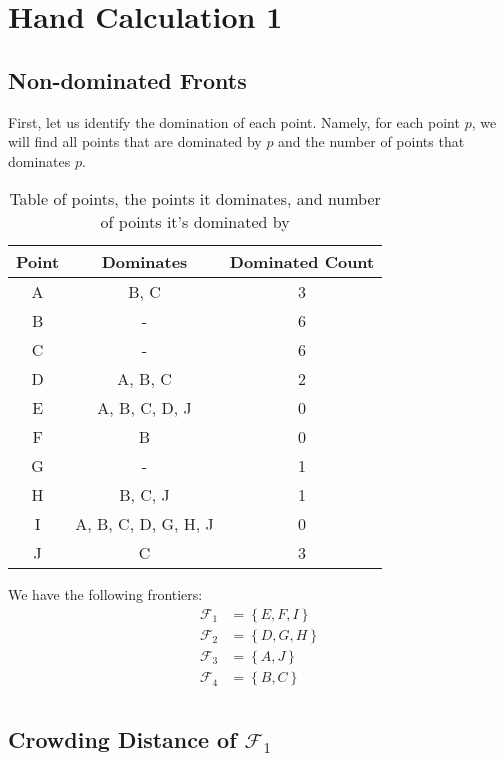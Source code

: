 \section{Hand Calculation 1}

\subsection{Non-dominated Fronts}

First, let us identify the domination of each point. Namely, for each point \(p\), we will find all points that are dominated by \(p\) and the number of points that dominates \(p\).

\begin{table}[ht]
    \centering
    \caption{Table of points, the points it dominates, and number of points it's dominated by}
    \begin{tabular}{ccc}
        \toprule
        \textbf{Point} & \textbf{Dominates} & \textbf{Dominated Count} \\
        \midrule
        A & B, C & 3 \\
        B & - & 6 \\
        C & - & 6 \\
        D & A, B, C & 2\\
        E & A, B, C, D, J & 0 \\
        F & B & 0 \\
        G & - & 1 \\
        H & B, C, J & 1 \\
        I & A, B, C, D, G, H, J & 0 \\
        J & C & 3 \\
        \bottomrule
    \end{tabular}
\end{table}


We have the following frontiers:
\[
\begin{aligned}
    \mathcal{F}_1 &= \left\{E, F, I\right\} \\
    \mathcal{F}_2 &= \left\{D, G, H\right\} \\
    \mathcal{F}_3 &= \left\{A, J\right\} \\
    \mathcal{F}_4 &= \left\{B, C\right\} \\
\end{aligned}
\]

\subsection{Crowding Distance of \(\mathcal{F}_1\)}

